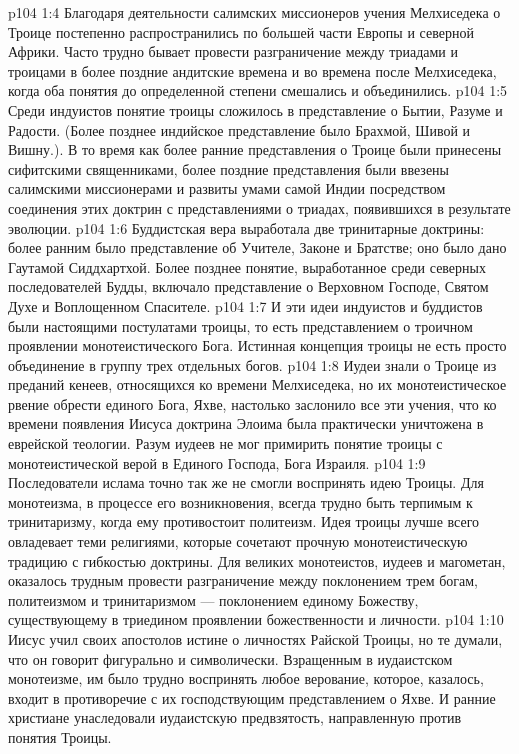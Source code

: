 \vs p104 1:4 Благодаря деятельности салимских миссионеров учения Мелхиседека о Троице постепенно распространились по большей части Европы и северной Африки. Часто трудно бывает провести разграничение между триадами и троицами в более поздние андитские времена и во времена после Мелхиседека, когда оба понятия до определенной степени смешались и объединились.
\vs p104 1:5 \pc Среди индуистов понятие троицы сложилось в представление о Бытии, Разуме и Радости. (Более позднее индийское представление было Брахмой, Шивой и Вишну.). В то время как более ранние представления о Троице были принесены сифитскими священниками, более поздние представления были ввезены салимскими миссионерами и развиты умами самой Индии посредством соединения этих доктрин с представлениями о триадах, появившихся в результате эволюции.
\vs p104 1:6 Буддистская вера выработала две тринитарные доктрины: более ранним было представление об Учителе, Законе и Братстве; оно было дано Гаутамой Сиддхартхой. Более позднее понятие, выработанное среди северных последователей Будды, включало представление о Верховном Господе, Святом Духе и Воплощенном Спасителе.
\vs p104 1:7 И эти идеи индуистов и буддистов были настоящими постулатами троицы, то есть представлением о троичном проявлении монотеистического Бога. Истинная концепция троицы не есть просто объединение в группу трех отдельных богов.
\vs p104 1:8 \pc Иудеи знали о Троице из преданий кенеев, относящихся ко времени Мелхиседека, но их монотеистическое рвение обрести единого Бога, Яхве, настолько заслонило все эти учения, что ко времени появления Иисуса доктрина Элоима была практически уничтожена в еврейской теологии. Разум иудеев не мог примирить понятие троицы с монотеистической верой в Единого Господа, Бога Израиля.
\vs p104 1:9 Последователи ислама точно так же не смогли воспринять идею Троицы. Для монотеизма, в процессе его возникновения, всегда трудно быть терпимым к тринитаризму, когда ему противостоит политеизм. Идея троицы лучше всего овладевает теми религиями, которые сочетают прочную монотеистическую традицию с гибкостью доктрины. Для великих монотеистов, иудеев и магометан, оказалось трудным провести разграничение между поклонением трем богам, политеизмом и тринитаризмом --- поклонением единому Божеству, существующему в триедином проявлении божественности и личности.
\vs p104 1:10 \pc Иисус учил своих апостолов истине о личностях Райской Троицы, но те думали, что он говорит фигурально и символически. Взращенным в иудаистском монотеизме, им было трудно воспринять любое верование, которое, казалось, входит в противоречие с их господствующим представлением о Яхве. И ранние христиане унаследовали иудаистскую предвзятость, направленную против понятия Троицы.
